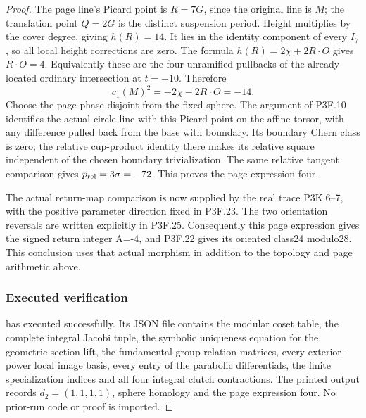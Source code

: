 \begin{proof}
The page line's Picard point is \(R=7G\), since the original line is \(M\); the translation point \(Q=2G\) is the distinct suspension period. Height multiplies by the cover degree, giving \(h(R)=14\). It lies in the identity component of every \(I_7\), so all local height corrections are zero. The formula \(h(R)=2\chi+2R\cdot O\) gives \(R\cdot O=4\). Equivalently these are the four unramified pullbacks of the already located ordinary intersection at \(t=-10\). Therefore \[
 c_1(M)^2=-2\chi-2R\cdot O=-14.
\] Choose the page phase disjoint from the fixed sphere. The argument of P3F.10 identifies the actual circle line with this Picard point on the affine torsor, with any difference pulled back from the base with boundary. Its boundary Chern class is zero; the relative cup-product identity there makes its relative square independent of the chosen boundary trivialization. The same relative tangent comparison gives \(p_{\rm rel}=3\sigma=-72\). This proves the page expression four.

The actual return-map comparison is now supplied by the real trace P3K.6--7, with the positive parameter direction fixed in P3F.23. The two orientation reversals are written explicitly in P3F.25. Consequently this page expression gives the signed return integer A=-4, and P3F.22 gives its oriented class24 modulo28. This conclusion uses that actual morphism in addition to the topology and page arithmetic above.

\subsubsection{Executed verification}\label{executed-verification}

 has executed successfully. Its JSON file contains the modular coset table, the complete integral Jacobi tuple, the symbolic uniqueness equation for the geometric section lift, the fundamental-group relation matrices, every exterior-power local image basis, every entry of the parabolic differentials, the finite specialization indices and all four integral clutch contractions. The printed output records \(d_2=(1,1,1,1)\), sphere homology and the page expression four. No prior-run code or proof is imported.
\end{proof}
